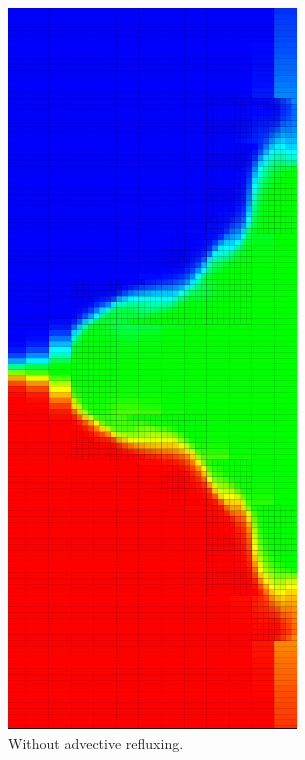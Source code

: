\documentclass[12pt]{article}
\begin{document}
\begin{figure}
\centering
\begin{subfigure}{.5\textwidth}
  \centering
  \includegraphics[width=.75\linewidth]{AdvectionCFErrorCropped.png}
  \caption{Without advective refluxing.}
  \label{fig:subWithoutRefluxing}
\end{subfigure}%
\begin{subfigure}{.5\textwidth}

\end{subfigure}
\end{figure}
\end{document}
